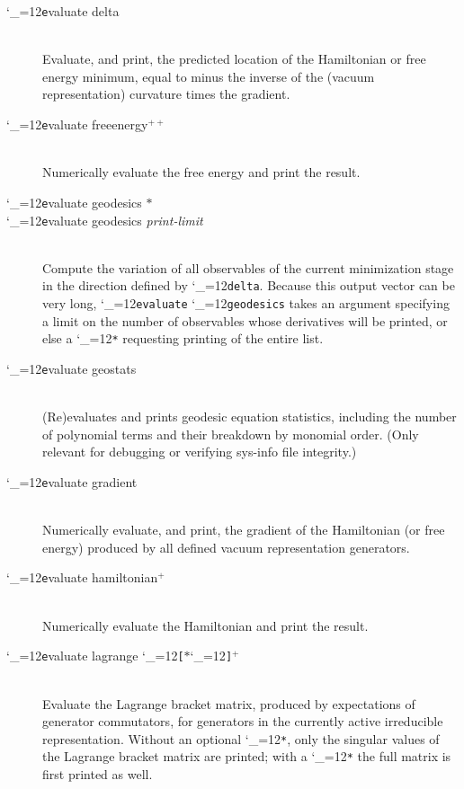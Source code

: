 \documentclass [12pt]{article}
\makeatletter
\renewcommand{\tt}{\begingroup\catcode`_=12\def\_{\string_}\tt@}
\newcommand{\tt@}[1]{\texttt{#1}\endgroup}
\makeatother
\begin{document}
\begin{description}
\item [\tt evaluate delta]~\\
    Evaluate, and print, the predicted location of the Hamiltonian or
    free energy minimum, equal to minus the inverse of the
    (vacuum representation) curvature times the gradient.

\item [\tt evaluate freeenergy$^{++}$]~\\
    Numerically evaluate the free energy and print the result.

\item [\tt evaluate geodesics $*$] \bgroup \itemsep 0pt \parskip 0pt
\item [\tt evaluate geodesics {\it print-limit}]~\\
    Compute the variation of all observables
    of the current minimization stage in the direction defined by \tt{delta}.
    Because this output vector can be very long, \tt{evaluate}
    \tt{geodesics} takes an argument specifying a limit on
    the number of observables whose derivatives will be printed,
    or else a \tt{*} requesting printing of the entire list.
\egroup

\item [\tt evaluate geostats]~\\
    (Re)evaluates and prints geodesic equation statistics,
    including the number of polynomial terms and their breakdown
    by monomial order.
    (Only relevant for debugging or verifying sys-info file integrity.)

\item [\tt evaluate gradient]~\\
    Numerically evaluate, and print, the gradient of the Hamiltonian
    (or free energy) produced by all defined vacuum representation generators.

\item [\tt evaluate hamiltonian$^+$]~\\
    Numerically evaluate the Hamiltonian and print the result.

\item [\tt evaluate lagrange \tt{[}$*$\tt{]}$^+$]~\\
    Evaluate the Lagrange bracket matrix,
    produced by expectations of generator commutators,
    for generators in the
    currently active irreducible representation.
    Without an optional \tt{*}, only the singular values of the Lagrange bracket
    matrix are printed;
    with a \tt{*} the full matrix is first printed as well.


\end{description}
\end{document}
